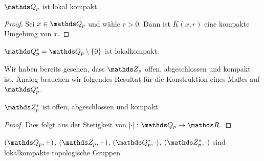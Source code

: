 \begin{prop}
$\Q_p$ ist lokal kompakt.
\end{prop}
\begin{proof}
Sei $x\in \Q_p$ und wähle $r>0$. Dann ist $\overline{K}(x,r)$ eine kompakte Umgebung von $x$.
\end{proof}

\begin{prop}
$\Q_p^\ast=\Q_p \setminus \{0\}$ ist lokalkompakt.
\end{prop}
Wir haben bereits gesehen, dass $\Z_p$ offen, abgeschlossen und kompakt ist.
Analog brauchen wir folgendes Resultat für die Konstruktion eines Maßes auf $\Q_p^\ast$.
\begin{prop}
$\Z_p^\ast$ ist offen, abgeschlossen und kompakt.
\end{prop}
\begin{proof}
Dies folgt aus der Stetigkeit von $\abs{\cdot} \colon \Q_p \to \R$.
\end{proof}

\begin{prop}
$(\Q_p,+)$, $(\Z_p,+)$, $(\Q_p^\ast,\cdot)$, $(\Z_p^\ast,\cdot)$
sind lokalkompakte topologische Gruppen
\end{prop}